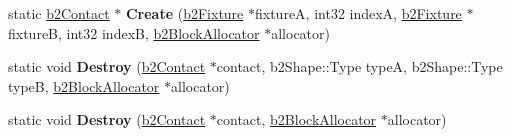 \begin{DoxyCompactItemize}
\item 
\mbox{\label{classb2Contact_a0ced22a8c626b8e5aaf5d98163cb157c}} 
static \hyperlink{classb2Contact}{b2\+Contact} $\ast$ {\bfseries Create} (\hyperlink{classb2Fixture}{b2\+Fixture} $\ast$fixtureA, int32 indexA, \hyperlink{classb2Fixture}{b2\+Fixture} $\ast$fixtureB, int32 indexB, \hyperlink{classb2BlockAllocator}{b2\+Block\+Allocator} $\ast$allocator)
\item 
\mbox{\label{classb2Contact_a36c1f6767f212f2e4ddb4c4b2c7cdb75}} 
static void {\bfseries Destroy} (\hyperlink{classb2Contact}{b2\+Contact} $\ast$contact, b2\+Shape\+::\+Type typeA, b2\+Shape\+::\+Type typeB, \hyperlink{classb2BlockAllocator}{b2\+Block\+Allocator} $\ast$allocator)
\item 
\mbox{\label{classb2Contact_ae45d9cd7b90e3933ba03c220340cb687}} 
static void {\bfseries Destroy} (\hyperlink{classb2Contact}{b2\+Contact} $\ast$contact, \hyperlink{classb2BlockAllocator}{b2\+Block\+Allocator} $\ast$allocator)
\end{DoxyCompactItemize}
